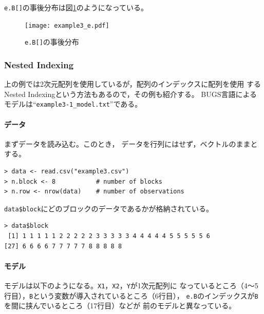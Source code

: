 \documentclass[11pt,uplatex]{jsarticle}
\begin{document}
\texttt{e.B[]}の事後分布は図\ref{example3_e_plot}のようになっている。

\begin{figure}[htbp]
	\begin{center}
		\texttt{[image: example3\_e.pdf]}
	\end{center}
	\caption{\texttt{e.B[]}の事後分布}
	\label{example3_e_plot}
\end{figure}

\subsubsection*{Nested Indexing}
上の例では2次元配列を使用しているが，配列のインデックスに配列を使用
するNested Indexingという方法もあるので，その例も紹介する。
BUGS言語によるモデルは``\texttt{example3-1\_model.txt}''である。

\paragraph{データ}

まずデータを読み込む。このとき，
データを行列にはせず，ベクトルのままとする。
\begin{lstlisting}
> data <- read.csv("example3.csv")
> n.block <- 8           # number of blocks
> n.row <- nrow(data)    # number of observations
\end{lstlisting}

\texttt{data\$block}にどのブロックのデータであるかが格納されている。
\begin{lstlisting}
> data$block
 [1] 1 1 1 1 1 2 2 2 2 2 3 3 3 3 3 4 4 4 4 4 5 5 5 5 5 6
[27] 6 6 6 6 7 7 7 7 7 8 8 8 8 8
\end{lstlisting}

\paragraph{モデル}

モデルは以下のようになる。\texttt{X1}，\texttt{X2}，\texttt{Y}が1次元配列に
なっているところ（4〜5行目），\texttt{B}という変数が導入されているところ（6行目），
\texttt{e.B}のインデックスが\texttt{B}を間に挟んでいるところ（17行目）などが
前のモデルと異なっている。
\end{document}
